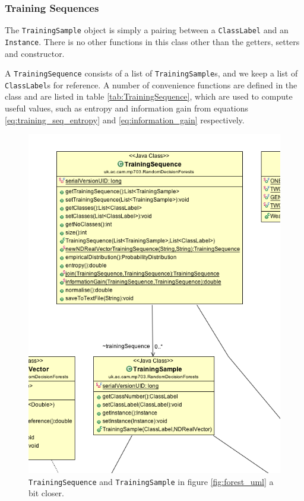 \documentclass[12pt,twoside,notitlepage]{report}
\begin{document}
            \subsubsection{Training Sequences}
                The \texttt{TrainingSample} object is simply a pairing between a \texttt{ClassLabel} and an 
                \texttt{Instance}. There is no other functions in this class other than the getters, setters and 
                constructor. 

                A \texttt{TrainingSequence} consists of a list of \texttt{TrainingSample}s, and we keep a list of 
                \texttt{ClassLabel}s for reference. A number of convenience functions are defined in the class and 
                are listed in table \ref{tab:TrainingSequence}, which are used to compute useful values, such as
                entropy and information gain from equations \ref{eq:training_seq_entropy} and \ref{eq:information_gain} 
                respectively.

                \begin{figure}[H]
                    \centering
                    \includegraphics[scale=0.5]{TrainingSequence_Forest_UML}
                    \caption{\texttt{TrainingSequence} and \texttt{TrainingSample} in figure \ref{fig:forest_uml} a bit closer.}
                    \label{fig:training_seq_uml}
                \end{figure}
\end{document}

